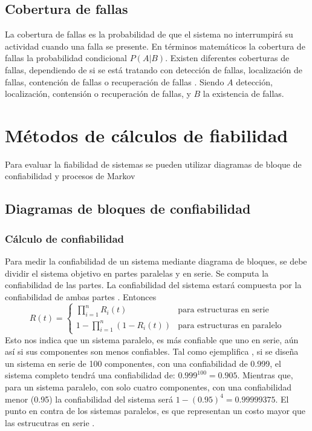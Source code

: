 \subsection{Cobertura de fallas}
La cobertura de fallas es la probabilidad  de que el sistema no interrumpirá su actividad cuando una falla se presente. En términos matemáticos la cobertura
de fallas la probabilidad condicional $P(A|B)$. Existen diferentes coberturas de fallas, dependiendo de si se está tratando con detección de fallas, localización de fallas, contención de
fallas o recuperación de fallas \citep{FTDesign}. Siendo $A$ detección, localización, contensión o recuperación de fallas, y $B$ la existencia de fallas.

\section{Métodos de cálculos de fiabilidad}
Para evaluar la fiabilidad de sistemas se pueden utilizar diagramas de bloque de confiabilidad y procesos de Markov \citep{FTDesign}

\subsection{Diagramas de bloques de confiabilidad}

\subsubsection{Cálculo de confiabilidad}
Para medir la confiabilidad de un sistema mediante diagrama de bloques, se debe dividir el sistema objetivo en  partes paralelas y en serie. Se computa la confiabilidad
de las partes. La confiabilidad del sistema estará compuesta por la confiabilidad de ambas partes \citep{FTDesign}. Entonces
$$R(t) = \left \{
\begin{matrix}
  \prod_{i=1}^{n} R_{i}(t) & \text{para estructuras en serie}\\
  1 - \prod_{i=1}^{n}(1-R_{i}(t)) & \text{para estructuras en paralelo}
\end{matrix} $$
Esto nos indica que un sistema paralelo, es más confiable que uno en serie, aún así si sus componentes son menos confiables. Tal como ejemplifica \cite{FTDesign}, si se diseña un sistema en serie de 100 componentes, con una confiabilidad de 0.999, el sistema completo tendrá una confiabilidad de:
$0.999^100 = 0.905$. Mientras que, para un sistema paralelo, con solo cuatro componentes, con una confiabilidad menor (0.95) la confiabilidad del sistema
será $1-(0.95)^4 = 0.99999375$. El punto en contra de los sistemas paralelos, es que representan un costo mayor que las estrucutras en serie \citep{FTDesign}.

